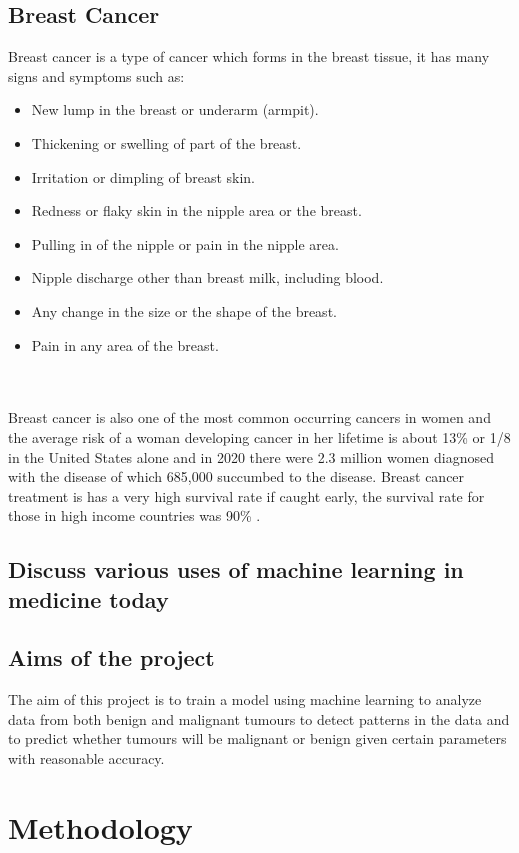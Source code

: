 \documentclass[conference]{IEEEtran}
\begin{document}
\subsection{Breast Cancer}
Breast cancer is a type of cancer which forms in the breast tissue, it has many signs and symptoms such as: 
\begin{itemize}
    \item New lump in the breast or underarm (armpit).
    \item Thickening or swelling of part of the breast.
    \item Irritation or dimpling of breast skin.
    \item Redness or flaky skin in the nipple area or the breast.
    \item Pulling in of the nipple or pain in the nipple area.
    \item Nipple discharge other than breast milk, including blood.
    \item Any change in the size or the shape of the breast.
    \item Pain in any area of the breast.
\end{itemize} \cite{symptomsofbreastcancer}
\\
\\
Breast cancer is also one of the most common occurring cancers in women and the average risk of a woman developing cancer in her lifetime is about 13\% or 1/8 in the United States alone\cite{howcommonisbreastcancer} and in 2020 there were 2.3 million women diagnosed with the disease of which 685,000 succumbed to the disease\cite{breastcancerstatistics}.  Breast cancer treatment is has a very high survival rate if caught early, the survival rate for those in high income countries was 90\% \cite{breastcancerstatistics}.
\subsection{Discuss various uses of machine learning in medicine today}

\subsection{Aims of the project}
 The aim of this project is to train a model using machine learning to analyze data from both benign and malignant tumours to detect patterns in the data and to predict whether tumours will be malignant or benign given certain parameters with reasonable accuracy.
\section{Methodology}
\end{document}

